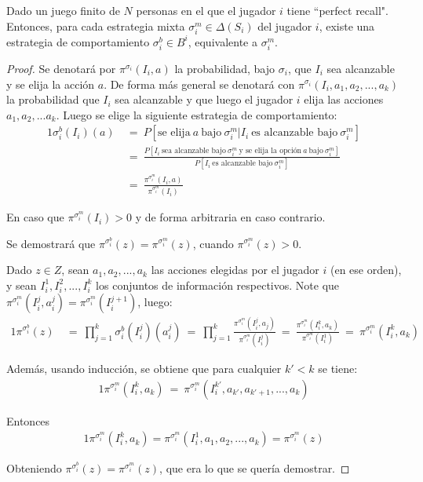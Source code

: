 \begin{theorem}
\label{theo:mixta-a-comportamiento}
Dado un juego finito de $N$ personas en el que el jugador $i$ tiene ``perfect recall". Entonces, para cada estrategia mixta $\sigma^m_i \in \Delta(S_i)$ del jugador $i$, existe una estrategia de comportamiento $\sigma^b_i \in B^i$, equivalente a $\sigma^m_i$.
\end{theorem}

\begin{proof}
Se denotará por $\pi^{\sigma_i}(I_i, a)$ la probabilidad, bajo $\sigma_i$, que $I_i$ sea alcanzable y se elija la acción $a$. De forma más general se denotará con $\pi^{\sigma_i}(I_i, a_1, a_2, ..., a_k)$ la probabilidad que $I_i$ sea alcanzable y que luego el jugador $i$ elija las acciones $a_1, a_2, ... a_k$. Luego se elige la siguiente estrategia de comportamiento:
\begin{alignat}{1}
\sigma_i^b(I_i)(a)\ &=\ P[\text{se elija}\ a\ \text{bajo}\ \sigma^m_i | I_i\ \text{es alcanzable bajo}\ \sigma^m_i] \\
&=\ \frac{P[I_i\ \text{sea alcanzable bajo}\ \sigma^m_i\ \text{y se elija la opción}\ a\ \text{bajo}\ \sigma^m_i]}{ P[I_i\ \text{es alcanzable bajo}\ \sigma^m_i] } \\
&=\ \frac{\pi^{\sigma^m_i}(I_i, a)}{\pi^{\sigma^m_i}(I_i)} \label{eq:mixta-a-comportamiento}
\end{alignat}

En caso que $\pi^{\sigma^m_i}(I_i) > 0$ y de forma arbitraria en caso contrario.

Se demostrará que $\pi^{\sigma^b_i}(z) = \pi^{\sigma^m_i}(z)$, cuando $\pi^{\sigma^m_i}(z) > 0$. 
	
Dado $z \in Z $, sean $a_1, a_2, ..., a_k$ las acciones elegidas por el jugador $i$ (en ese orden), y sean $I^1_i, I^2_i, ..., I^k_i$ los conjuntos de información respectivos. Note que $\pi^{\sigma^m_i}(I^j_i, a^j_i) = \pi^{\sigma^m_i}(I^{j+1}_i)$, luego:
\begin{alignat}{1}
\pi^{\sigma^b_i}(z)\ &=\ \prod_{j = 1}^k \sigma^b_i(I^j_i)(a^j_i)\ =\ \prod _{j = 1}^k \frac{\pi^{\sigma^m_i}(I^j_i, a_j)}{\pi^{\sigma^m_i}(I^j_i)}\ =\ \frac{\pi^{\sigma^m_i}(I^k_i, a_k)}{\pi^{\sigma^m_i}(I^1_i)}\ =\ \pi^{\sigma^m_i}(I^k_i, a_k)
\end{alignat}

Además, usando inducción, se obtiene que para cualquier $k' < k$ se tiene:
\begin{alignat}{1}
\pi^{\sigma^m_i}(I^k_i, a_k)\ =\ \pi^{\sigma^m_i} (I^{k'}_i, a_{k'}, a_{k'+1}, ..., a_{k})
\end{alignat}

Entonces
\begin{alignat}{1}
\pi^{\sigma^m_i}(I^k_i, a_k) = \pi^{\sigma^m_i}(I^1_i, a_1, a_2, ..., a_k) = \pi^{\sigma^m_i}(z)
\end{alignat}

Obteniendo $\pi^{\sigma^b_i}(z) = \pi^{\sigma^m_i}(z)$, que era lo que se quería demostrar.
\end{proof}

